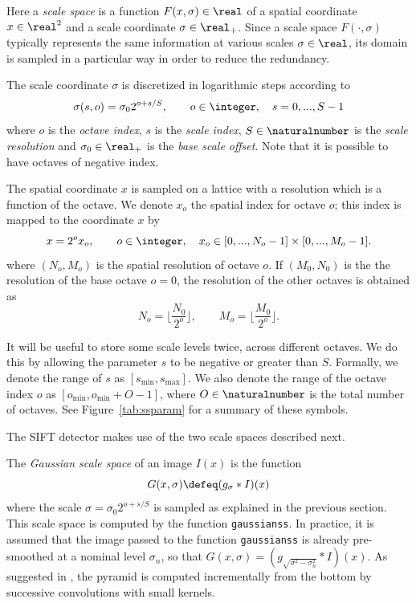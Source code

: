 \documentclass{article}
\let\oldtt=\tt
\renewcommand{\tt}{\oldtt\color{codecolor}}
\begin{document}
Here a {\em scale space} is a function $F(x,\sigma) \in \real$ of a spatial coordinate $x\in\real^2$ and a scale coordinate $\sigma\in\real_+$. Since a scale space $F(\cdot,\sigma)$ typically represents the same information at various scales $\sigma\in\real$, its domain is sampled in a particular way in order to reduce the redundancy.

The scale coordinate $\sigma$ is discretized in logarithmic steps according to
\[
   \sigma(s,o) = \sigma_0 2^{o + s/S}, 
   \qquad o\in\integer,
   \quad s=0,...,S-1
\]
where $o$ is the {\em octave index}, $s$ is the {\em scale index}, $S\in \naturalnumber$ is the {\em scale resolution} and $\sigma_0\in\real_+$ is the {\em base scale offset}. Note that it is possible to have octaves of negative index.

The spatial coordinate $x$ is sampled on a lattice with a resolution which is a function of the octave. We denote $x_o$ the spatial index for octave $o$; this index is mapped to the coordinate $x$ by
\[
  x = 2^o x_o, 
  \qquad o\in\integer,
  \quad x_o \in [0,...,N_o-1]\times[0,...,M_o-1].
\] 
where $(N_o,M_o)$ is the spatial resolution of octave $o$. If $(M_0,N_0)$ is the the resolution of the base octave $o=0$, the resolution of the other octaves is obtained as
\[
 N_o = \lfloor \frac{N_0}{2^o}\rfloor,
 \qquad
 M_o = \lfloor \frac{M_0}{2^o}\rfloor.
\]

It will be useful to store some scale levels twice, across different octaves. We do this by allowing the parameter $s$ to be negative or greater than $S$. Formally, we denote the range of $s$ as $[s_{\min},s_{\max}]$. We also denote the range of the octave index $o$ as $[o_{\min},o_{\min}+O-1]$, where $O\in\naturalnumber$ is the total number of octaves. See Figure~\ref{tab:ssparam} for a summary of these symbols.

The SIFT detector makes use of the two scale spaces described next.

\medskip
{} The {\em Gaussian scale space} of an image $I(x)$ is the function
\[
   G(x,\sigma) \defeq (g_\sigma * I)(x)
\]
where the scale $\sigma = \sigma_0 2^{o+s/S}$ is sampled as explained in the previous section. This scale space is computed by the function {\tt gaussianss}. In practice, it is assumed that the image passed to the function 
{\tt gaussianss} is already pre-smoothed at a nominal level $\sigma_n$, so that 
$G(x,\sigma) = (g_{\sqrt{\sigma^2 - \sigma_n^2}} * I)(x)$. As suggested in
\cite{lowe04distinctive}, the pyramid is computed incrementally from the bottom by successive convolutions with small kernels.
\end{document}
